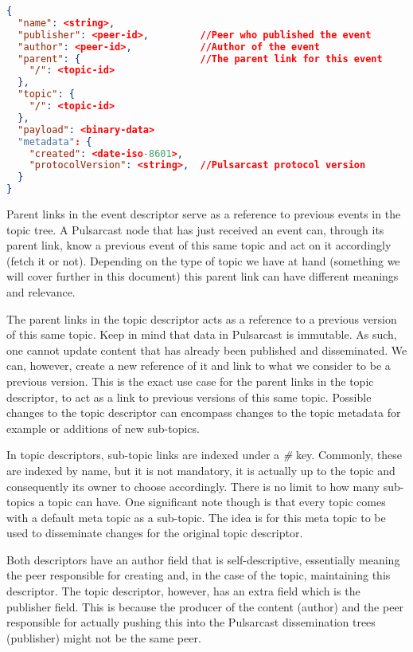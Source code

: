 \begin{lstlisting}[float, language=JSON,caption={Event descriptor schema in a JSON based format},label={event-descriptor}]
{
  "name": <string>,
  "publisher": <peer-id>,         //Peer who published the event
  "author": <peer-id>,            //Author of the event
  "parent": {                     //The parent link for this event
    "/": <topic-id>
  },
  "topic": {
    "/": <topic-id>
  },
  "payload": <binary-data>
  "metadata": {
    "created": <date-iso-8601>,
    "protocolVersion": <string>,  //Pulsarcast protocol version
  }
}
\end{lstlisting}


Parent links in the event descriptor serve as a reference to previous events in
the topic tree. A Pulsarcast node that has just received an event can, through
its parent link, know a previous event of this same topic and act on it
accordingly (fetch it or not). Depending on the type of topic we have at hand
(something we will cover further in this document) this parent link can have
different meanings and relevance.

The parent links in the topic descriptor acts as a reference to a previous
version of this same topic. Keep in mind that data in Pulsarcast is immutable.
As such, one cannot update content that has already been published and
disseminated. We can, however, create a new reference of it and link to what we
consider to be a previous version. This is the exact use case for the parent
links in the topic descriptor, to act as a link to previous versions of this
same topic. Possible changes to the topic descriptor can encompass changes to
the topic metadata for example or additions of new sub-topics.

In topic descriptors, sub-topic links are indexed under a \emph{\#} key.
Commonly, these are indexed by name, but it is not mandatory, it is actually up
to the topic and consequently its owner to choose accordingly.  There is no
limit to how many sub-topics a topic can have. One significant note though is
that every topic comes with a default meta topic as a sub-topic. The idea is
for this meta topic to be used to disseminate changes for the original topic
descriptor.

Both descriptors have an author field that is self-descriptive, essentially
meaning the peer responsible for creating and, in the case of the topic,
maintaining this descriptor. The topic descriptor, however, has an extra field
which is the publisher field. This is because the producer of the content
(author) and the peer responsible for actually pushing this into the Pulsarcast
dissemination trees (publisher) might not be the same peer.


